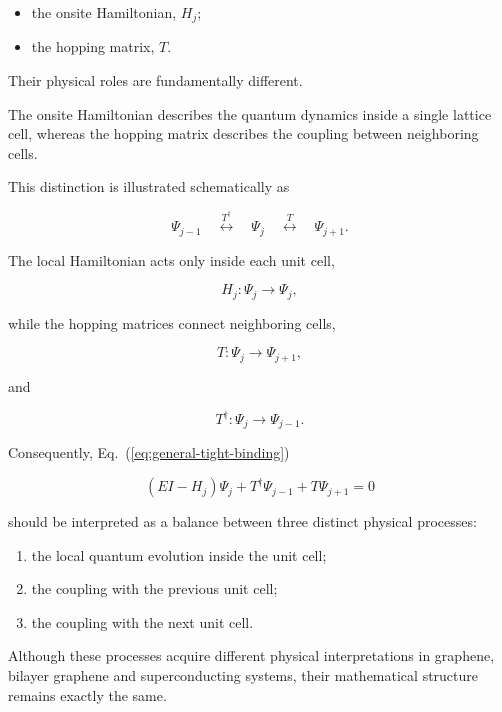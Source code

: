 \begin{itemize}

	\item the onsite Hamiltonian,
	      $H_j$;

	\item the hopping matrix,
	      $T$.

\end{itemize}

Their physical roles are fundamentally different.

The onsite Hamiltonian describes the quantum dynamics inside a single
lattice cell, whereas the hopping matrix describes the coupling between
neighboring cells.

This distinction is illustrated schematically as

\[
	\boxed{
		\Psi_{j-1}
		\quad
		\overset{T^\dagger}{\longleftrightarrow}
		\quad
		\Psi_j
		\quad
		\overset{T}{\longleftrightarrow}
		\quad
		\Psi_{j+1}.
	}
\]

The local Hamiltonian acts only inside each unit cell,

\[
	H_j :
	\Psi_j
	\longrightarrow
	\Psi_j,
\]

while the hopping matrices connect neighboring cells,

\[
	T :
	\Psi_j
	\longrightarrow
	\Psi_{j+1},
\]

and

\[
	T^\dagger :
	\Psi_j
	\longrightarrow
	\Psi_{j-1}.
\]

Consequently, Eq.~(\ref{eq:general-tight-binding})

\[
	(EI-H_j)\Psi_j
	+
	T^\dagger\Psi_{j-1}
	+
	T\Psi_{j+1}
	=
	0
\]

should be interpreted as a balance between three distinct physical
processes:

\begin{enumerate}

	\item
	      the local quantum evolution inside the unit cell;

	\item
	      the coupling with the previous unit cell;

	\item
	      the coupling with the next unit cell.

\end{enumerate}

Although these processes acquire different physical interpretations in
graphene, bilayer graphene and superconducting systems, their
mathematical structure remains exactly the same.

